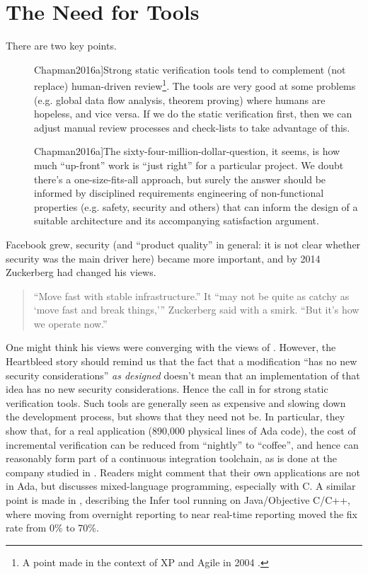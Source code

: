 \documentclass{eptcs}
\begin{document}
\section{The Need for Tools}
\def\foo{\cite[\S 4.1]{Chapman2016a}}
\def\bar{\cite[\S 6]{Chapman2016a}}
There are two key points.
\begin{description}
\item[\foo]Strong static verification tools tend to complement (not replace) human-driven review\footnote{A point made in the context of XP and Agile in 2004 \cite{Wayrynenetal2004}.}. The tools are very good at some problems (e.g. global data flow analysis, theorem proving) where humans are hopeless, and vice versa. If we do the static verification first, then we can adjust manual review processes and check-lists to take advantage of this.
\item[\bar]The sixty-four-million-dollar-question, it seems, is how much ``up-front'' work is ``just right'' for a particular project. We doubt there’s a one-size-fits-all approach, but surely the answer should be informed by disciplined requirements engineering of non-functional properties (e.g. safety, security and others) that can inform the design of a suitable architecture and its accompanying satisfaction argument.
\end{description}
\par\noindent
Facebook grew, security (and ``product quality'' in general: it is not clear whether security was the main driver here) became more important, and by 2014 Zuckerberg had changed his views.
\begin{quote}
``Move fast with stable infrastructure.'' It ``may not be quite as catchy as `move fast and break things,''' Zuckerberg said with a smirk. ``But it's how we operate now.'' \cite{Statt2014a}
\end{quote}
\par\noindent
One might think his views were converging with the views of  \cite{Chapman2016a}. However, the Heartbleed story should remind us that the fact that a modification ``has no new security considerations''  \emph{as designed}  \cite{Seggelmannetal2012a} doesn't mean that an implementation of that idea has no new security considerations. Hence the call in \foo{} for strong static verification tools. Such tools are generally seen as expensive and slowing down the development process, but \cite{BrainSchanda2012a} shows that they need not be. In particular, they show that, for a real application (890,000 physical lines of Ada code), the cost of incremental verification can be reduced from ``nightly'' to ``coffee'', and hence can reasonably form part of a continuous integration toolchain, as is done at the company studied in \cite{BrainSchanda2012a}. Readers might  comment that their own applications are not in Ada, but \cite[\S5.6]{ChapmanMoy2018a} discusses mixed-language programming, especially with C.  A similar point is made in \cite{Distefanoetal2019a}, describing the Infer tool running on Java/Objective C/C++, where moving from overnight reporting to near real-time reporting moved the fix rate from 0\% to 70\%.
\end{document}
